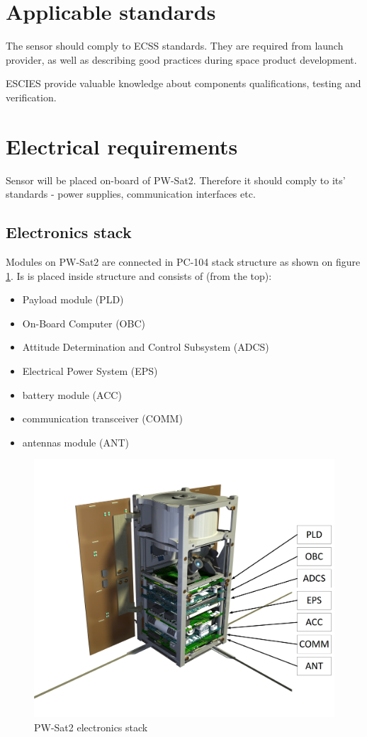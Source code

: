 \section{Applicable standards}
	The sensor should comply to ECSS \cite{ECSS_URL} standards. They are required from launch provider, as well as describing good practices during space product development.
	
	ESCIES \cite{ESCIES_URL} provide valuable knowledge about components qualifications, testing and verification.



\section{Electrical requirements}
	Sensor will be placed on-board of PW-Sat2. Therefore it should comply to its' standards - power supplies, communication interfaces etc.
	
\subsection{Electronics stack}
	Modules on PW-Sat2 are connected in PC-104 stack structure as shown on figure \ref{PW-Sat2_stack}. Is is placed inside structure and consists of (from the top):
	\begin{itemize}
		\item Payload module (PLD)
		\item On-Board Computer (OBC)
		\item Attitude Determination and Control Subsystem (ADCS)
		\item Electrical Power System (EPS)
		\item battery module (ACC)
		\item communication transceiver (COMM)
		\item antennas module (ANT)
	\end{itemize}

	\begin{figure}[H]
		\centering
		\includegraphics[width=0.7\paperwidth]{img/PW-Sat2-stack.png}
		\caption{PW-Sat2 electronics stack}
		\label{PW-Sat2_stack}
	\end{figure}


